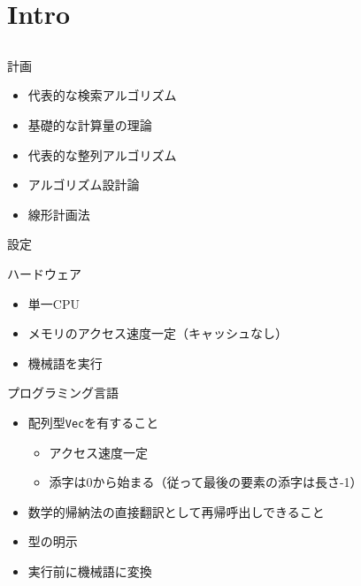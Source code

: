 \documentclass{beamer}
\subtitle{}
\begin{document}
\begin{frame}[fragile]{}
\titlepage
\end{frame}

\section{Intro}		%
\subsection{}

\begin{frame}[fragile]{計画}{}
\begin{itemize}\itemsep8pt
\item 代表的な検索アルゴリズム
\item 基礎的な計算量の理論
\item 代表的な整列アルゴリズム
\item アルゴリズム設計論
\item 線形計画法
\end{itemize}
\end{frame}

\begin{frame}[fragile]{設定}{}

\begin{exampleblock}{ハードウェア}
\begin{itemize}%
\item 単一CPU
\item メモリのアクセス速度一定（キャッシュなし）
\item 機械語を実行
\end{itemize}
\end{exampleblock}

\begin{exampleblock}{プログラミング言語}
\begin{itemize}%
\item 配列型{\tt Vec}を有すること
\begin{itemize}%
\item アクセス速度一定
\item 添字は0から始まる（従って最後の要素の添字は長さ-1）
\end{itemize}
\item 数学的帰納法の直接翻訳として再帰呼出しできること
\item 型の明示
\item 実行前に機械語に変換
\end{itemize}
\end{exampleblock}
\end{frame}
\end{document}
